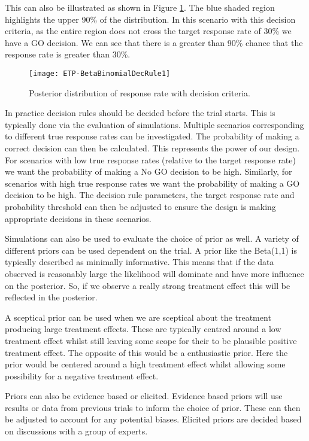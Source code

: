 This can also be illustrated as shown in Figure \ref{fig_etp:bb_dec_rule1}. The blue shaded region highlights the upper 90\% of the distribution. In this scenario with this decision criteria, as the entire region does not cross the target response rate of 30\% we have a GO decision. We can see that there is a greater than 90\% chance that the response rate is greater than 30\%. 

 \begin{figure}[h!]
 	\centering
 	\caption{Posterior distribution of response rate with decision criteria.}
 	\label{fig_etp:bb_dec_rule1}
 	\texttt{[image: ETP-BetaBinomialDecRule1]}
 \end{figure}

In practice decision rules should be decided before the trial starts. This is typically done via the evaluation of simulations. Multiple scenarios corresponding to different true response rates can be investigated. The probability of making a correct decision can then be calculated. This represents the power of our design. For scenarios with low true response rates (relative to the target response rate) we want the probability of making a No GO decision to be high. Similarly, for scenarios with high true response rates we want the probability of making a GO decision to be high. The decision rule parameters, the target response rate and probability threshold can then be adjusted to ensure the design is making appropriate decisions in these scenarios. 

Simulations can also be used to evaluate the choice of prior as well. A variety of different priors can be used dependent on the trial. A prior like the Beta(1,1) is typically described as minimally informative. This means that if the data observed is reasonably large the likelihood will dominate and have more influence on the posterior. So, if we observe a really strong treatment effect this will be reflected in the posterior. 

A sceptical prior can be used when we are sceptical about the treatment producing large treatment effects. These are typically centred around a low treatment effect whilst still leaving some scope for their to be plausible positive treatment effect. The opposite of this would be a enthusiastic prior. Here the prior would be centered around a high treatment effect whilst allowing some possibility for a negative treatment effect.

Priors can also be evidence based or elicited. Evidence based priors will use results or data from previous trials to inform the choice of prior. These can then be adjusted to account for any potential biases. Elicited priors are decided based on discussions with a group of experts. 

